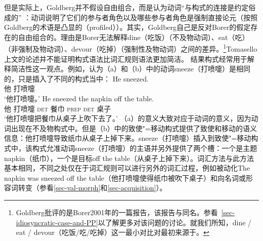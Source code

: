 \noindent
    但是实际上，Goldberg并不假设自由组合，而是认为动词“与构式的连接是约定俗成的” \citep[]{Goldberg95a}：动词说明了它们的参与者角色以及哪些参与者角色是强制直接论元（按照Goldberg的术语是凸显的（profiled））。其实，Goldberg自己\citeyearpar[]{Goldberg2006a}是反对Borer的假定存在的自由组合的\citeyearpar{Borer2003a-u}。理由是Borer无法解释dine（吃饭）（不及物动词）、eat（吃）（非强制及物动词）、devour（吃掉）（强制性及物动词）之间的差异。\footnote{Goldberg批评的是Borer2001年的一篇报告，该报告与同名。参看~\ref{sec-idiosyncratic-case-and-PP}以了解更多对该问题的讨论。就我们所知，dine / eat / devour（吃饭/吃/吃掉）这一最小对比对最初来源于\citet[--90]{Dowty89b-u}。}Tomasello上文的论述并不能证明构式语法比词汇规则语法更加简洁。
    结果构式经常用于解释简洁性这一观点。例如，\citet[\S~7]{Goldberg95a}认为（a）和（b）中的动词sneeze（打喷嚏）是相同的，只是插入了不同的构式当中：
\eal
\ex 
\gll He sneezed.\\
他 打喷嚏\\
\glt `他打喷嚏。'  
\ex 
\gll He sneezed the napkin off the table.\\
他 打喷嚏 \textsc{det} 餐巾 \textsc{prep} \textsc{det} 桌子 \\
\glt `他打喷嚏把餐巾从桌子上吹下去了。'  
\zl
（a）的意义大致对应于动词的意义，因为动词出现在不及物构式中。但是（b）中的致使"=移动构式提供了致使和移动的语义信息：他打喷嚏导致纸巾从桌子上掉下来。sneeze（打喷嚏）插入到致使"=移动构式中，该构式允准动词sneeze（打喷嚏）的主语并另外提供了两个槽：一个是主题napkin（纸巾），一个是目标off the table（从桌子上掉下来）。词汇方法与此方法基本相同，不同之处仅在于词汇规则可以进行另外的词汇过程，例如被动化The napkin was sneezed off the table（他打喷嚏使得纸巾被吹下桌子）和向名词或形容词转变（参看\ref{sec-val-morph}和\ref{sec-acquisition}）。   
